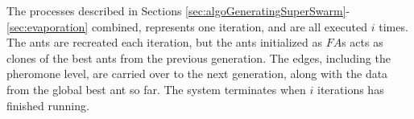 
The processes described in Sections \ref{sec:algoGeneratingSuperSwarm}-\ref{sec:evaporation} combined, represents one iteration, and are all executed $i$ times. The ants are recreated each iteration, but the ants initialized as $FA$s acts as clones of the best ants from the previous generation. The edges, including the pheromone level, are carried over to the next generation, along with the data from the global best ant so far. The system terminates when $i$ iterations has finished running. 